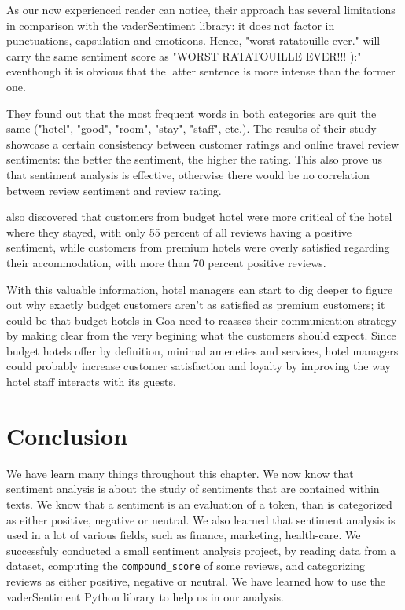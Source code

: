 	As our now experienced reader can notice, their approach has several limitations in comparison with the vaderSentiment library: it does not factor in punctuations, capsulation and emoticons. Hence, "worst ratatouille ever." will carry the same sentiment score as "WORST RATATOUILLE EVER!!! ):" eventhough it is obvious that the latter sentence is more intense than the former one.
	
	They found out that the most frequent words in both categories are quit the same ("hotel", "good", "room", "stay", "staff", etc.). The results of their study showcase a certain consistency between customer ratings and online travel review sentiments: the better the sentiment, the higher the rating. This also prove us that sentiment analysis is effective, otherwise there would be no correlation between review sentiment and review rating.
	
	\cite{geetha_relationship_2017} also discovered that customers from budget hotel were more critical of the hotel where they stayed, with only 55 percent of all reviews having a positive sentiment, while customers from premium hotels were overly satisfied regarding their accommodation, with more than 70 percent positive reviews.
	
	With this valuable information, hotel managers can start to dig deeper to figure out why exactly budget customers aren't as satisfied as premium customers; it could be that budget hotels in Goa need to reasses their communication strategy by making clear from the very begining what the customers should expect. Since budget hotels offer by definition, minimal ameneties and services, hotel managers could probably increase customer satisfaction and loyalty by improving the way hotel staff interacts with its guests.
	
	\section{Conclusion}
	We have learn many things throughout this chapter. We now know that sentiment analysis is about the study of sentiments that are contained within texts. We know that a sentiment is an evaluation of a token, than is categorized as either positive, negative or neutral. We also learned that sentiment analysis is used in a lot of various fields, such as finance, marketing, health-care. We successfuly conducted a small sentiment analysis project, by reading data from a dataset, computing the \verb|compound_score| of some reviews, and categorizing reviews as either positive, negative or neutral. We have learned how to use the vaderSentiment Python library to help us in our analysis.
	

